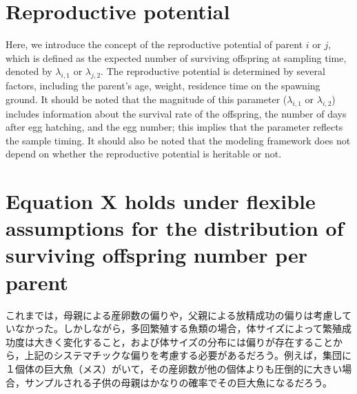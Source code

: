 \documentclass[12pt, English]{article}
\begin{document}
\begin{spacing}{1.9}
\section*{Reproductive potential}

\renewcommand{\theequation}{A\arabic{equation}}
Here, we introduce the concept of the reproductive potential of parent $i$ or $j$, which is defined as the expected number of surviving offspring at sampling time, denoted by $\lambda_{i,1}$ or $\lambda_{j,2}$. The reproductive potential is determined by several factors, including the parent’s age, weight, residence time on the spawning ground. It should be noted that the magnitude of this parameter ($\lambda_{i,1}$ or $\lambda_{i,2}$) includes information about the survival rate of the offspring, the number of days after egg hatching, and the egg number; this implies that the parameter reflects the sample timing. It should also be noted that the modeling framework does not depend on whether the reproductive potential is heritable or not.





\section*{Equation X holds under flexible assumptions for the distribution of surviving offspring number per parent}

\renewcommand{\theequation}{B\arabic{equation}}

これまでは，母親による産卵数の偏りや，父親による放精成功の偏りは考慮していなかった。しかしながら，多回繁殖する魚類の場合，体サイズによって繁殖成功度は大きく変化すること，および体サイズの分布には偏りが存在することから，上記のシステマチックな偏りを考慮する必要があるだろう。例えば，集団に１個体の巨大魚（メス）がいて，その産卵数が他の個体よりも圧倒的に大きい場合，サンプルされる子供の母親はかなりの確率でその巨大魚になるだろう。


\end{spacing}
\end{document}
